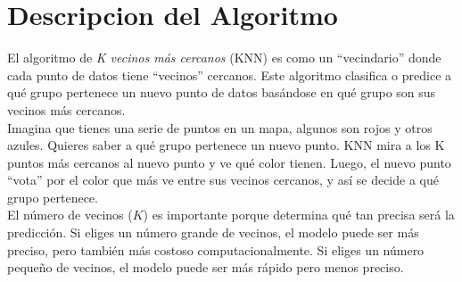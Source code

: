 
\section{Descripcion del Algoritmo} \label{sec:Descripcion del Algoritmo}

El algoritmo de \textit{K vecinos más cercanos} (KNN) es como un ``vecindario'' donde cada punto de datos tiene ``vecinos'' cercanos. Este algoritmo clasifica o predice a qué grupo pertenece un nuevo punto de datos basándose en qué grupo son sus vecinos más cercanos.
\\
Imagina que tienes una serie de puntos en un mapa, algunos son rojos y otros azules. Quieres saber a qué grupo pertenece un nuevo punto. KNN mira a los K puntos más cercanos al nuevo punto y ve qué color tienen. Luego, el nuevo punto ``vota'' por el color que más ve entre sus vecinos cercanos, y así se decide a qué grupo pertenece.
\\
El número de vecinos ($K$) es importante porque determina qué tan precisa será la predicción. Si eliges un número grande de vecinos, el modelo puede ser más preciso, pero también más costoso computacionalmente. Si eliges un número pequeño de vecinos, el modelo puede ser más rápido pero menos preciso.
